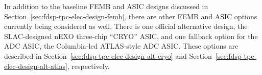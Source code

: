 In addition to the baseline FEMB and ASIC designs discussed in Section~\ref{sec:fdsp-tpc-elec-design-femb}, there are other FEMB and ASIC options currently being considered as well.  There is one official alternative design, the SLAC-designed nEXO three-chip ``CRYO'' ASIC, and one fallback option for the ADC ASIC, the Columbia-led ATLAS-style ADC ASIC.  These options are described in Section~\ref{sec:fdsp-tpc-elec-design-alt-cryo} and Section~\ref{sec:fdsp-tpc-elec-design-alt-atlas}, respectively.
